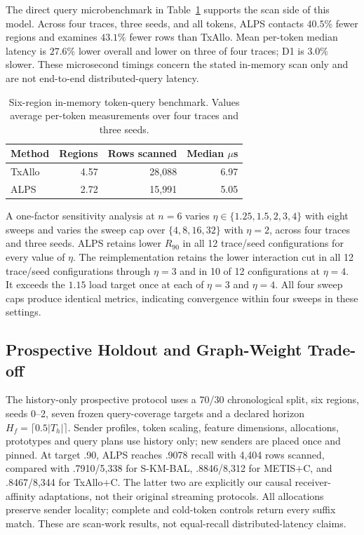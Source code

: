 \documentclass[runningheads]{llncs}
\begin{document}
The direct query microbenchmark in Table~\ref{tab:retrieval} supports the scan
side of this model. Across four traces, three seeds, and all tokens, ALPS
contacts $40.5\%$ fewer regions and examines $43.1\%$ fewer rows than TxAllo.
Mean per-token median latency is $27.6\%$ lower overall and lower on three of
four traces; D1 is $3.0\%$ slower. These microsecond timings concern the stated
in-memory scan only and are not end-to-end distributed-query latency.

\begin{table}[t]
\caption{Six-region in-memory token-query benchmark. Values average per-token
measurements over four traces and three seeds.}
\label{tab:retrieval}
\centering
\small
\setlength{\tabcolsep}{4pt}
\begin{tabular}{@{}lrrr@{}}
\toprule
Method & Regions & Rows scanned & Median $\mu$s\\
\midrule
TxAllo & 4.57 & 28,088 & 6.97\\
ALPS   & 2.72 & 15,991 & 5.05\\
\bottomrule
\end{tabular}
\end{table}

A one-factor sensitivity analysis at $n=6$ varies
$\eta\in\{1.25,1.5,2,3,4\}$ with eight sweeps and varies the sweep cap over
$\{4,8,16,32\}$ with $\eta=2$, across four traces and three seeds. ALPS retains
lower $R_{90}$ in all 12 trace/seed configurations for every value of $\eta$.
The reimplementation retains the lower interaction cut in all 12 trace/seed configurations
through $\eta=3$ and in 10 of 12 configurations at $\eta=4$. It exceeds the
$1.15$ load target once at each of $\eta=3$ and $\eta=4$. All four sweep caps
produce identical metrics, indicating convergence within four sweeps in these
settings.

\FloatBarrier

\subsection{Prospective Holdout and Graph-Weight Trade-off}
\label{sec:prospective}
The history-only prospective protocol uses a 70/30 chronological split, six
regions, seeds 0--2, seven frozen query-coverage targets and a declared horizon
$H_f=\lceil0.5|T_h|\rceil$. Sender profiles, token scaling, feature dimensions,
allocations, prototypes and query plans use history only; new senders are
placed once and pinned. At target .90, ALPS reaches .9078 recall with 4,404
rows scanned, compared with .7910/5,338 for S-KM-BAL, .8846/8,312 for
METIS$+$C, and .8467/8,344 for TxAllo$+$C. The latter two are explicitly our
causal receiver-affinity adaptations, not their original streaming protocols.
All allocations preserve sender locality; complete and cold-token controls
return every suffix match. These are scan-work results, not equal-recall
distributed-latency claims.
\end{document}

